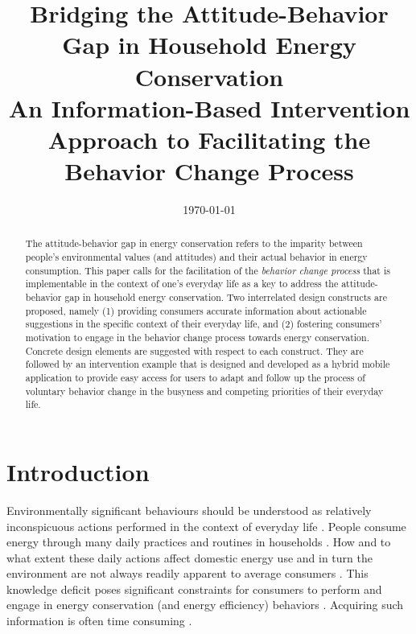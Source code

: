 \documentclass[a4paper]{article}
\title{\Large{Bridging the Attitude-Behavior Gap in Household Energy Conservation}\\
\large{An Information-Based Intervention Approach to Facilitating the Behavior Change Process}}
\date{\today}
\begin{document}
\maketitle

\begin{abstract}
The attitude-behavior gap in energy conservation refers to the imparity between people's environmental values (and attitudes) and their actual behavior in energy consumption. This paper calls for the facilitation of the \textit{behavior change process} that is implementable in the context of one's everyday life as a key to address the attitude-behavior gap in household energy conservation. Two interrelated design constructs are proposed, namely (1) providing consumers accurate information about actionable suggestions in the specific context of their everyday life, and (2) fostering consumers' motivation to engage in the behavior change process towards energy conservation. Concrete design elements are suggested with respect to each construct. They are followed by an intervention example that is designed and developed as a hybrid mobile application to provide easy access for users to adapt and follow up the process of voluntary behavior change in the busyness and competing priorities of their everyday life.  
\end{abstract}

\section{Introduction}
\label{sec:intro}

Environmentally significant behaviours should be understood as relatively inconspicuous actions performed in the context of everyday life \citep{Burgess2008}. People consume energy through many daily practices and routines in households \citep{Burgess2008,Hargreaves2010, Fehrenbacher2011,Burchell2014}. How and to what extent these daily actions affect domestic energy use and in turn the environment are not always readily apparent to average consumers \citep{Burgess2008,Delmas2013}. This knowledge deficit poses significant constraints for consumers to perform and engage in energy conservation (and energy efficiency) behaviors \citep{Schultz2002,Burchell2014}. Acquiring such information is often time consuming \citep{Delmas2013}. 
\end{document}
